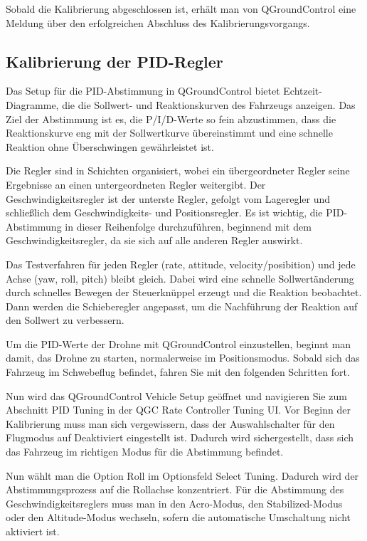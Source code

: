 Sobald die Kalibrierung abgeschlossen ist, erhält man von QGroundControl eine Meldung über den erfolgreichen Abschluss des Kalibrierungsvorgangs.

\subsection{Kalibrierung der PID-Regler}
Das Setup für die PID-Abstimmung in QGroundControl bietet Echtzeit-Diagramme, die die Sollwert- und Reaktionskurven des Fahrzeugs anzeigen. Das Ziel der Abstimmung ist es, die P/I/D-Werte so fein abzustimmen, dass die Reaktionskurve eng mit der Sollwertkurve übereinstimmt und eine schnelle Reaktion ohne Überschwingen gewährleistet ist.

Die Regler sind in Schichten organisiert, wobei ein übergeordneter Regler seine Ergebnisse an einen untergeordneten Regler weitergibt. Der Geschwindigkeitsregler ist der unterste Regler, gefolgt vom Lageregler und schließlich dem Geschwindigkeits- und Positionsregler. Es ist wichtig, die PID-Abstimmung in dieser Reihenfolge durchzuführen, beginnend mit dem Geschwindigkeitsregler, da sie sich auf alle anderen Regler auswirkt.

Das Testverfahren für jeden Regler (rate, attitude, velocity/posibition) und jede Achse (yaw, roll, pitch) bleibt gleich. Dabei wird eine schnelle Sollwertänderung durch schnelles Bewegen der Steuerknüppel erzeugt und die Reaktion beobachtet. Dann werden die Schieberegler angepasst, um die Nachführung der Reaktion auf den Sollwert zu verbessern.

Um die PID-Werte der Drohne mit QGroundControl einzustellen, beginnt man damit, das Drohne zu starten, normalerweise im Positionsmodus. Sobald sich das Fahrzeug im Schwebeflug befindet, fahren Sie mit den folgenden Schritten fort.

Nun wird  das QGroundControl Vehicle Setup geöffnet und navigieren Sie zum Abschnitt PID Tuning in der QGC Rate Controller Tuning UI. Vor Beginn der Kalibrierung muss man sich vergewissern, dass der Auswahlschalter für den Flugmodus auf Deaktiviert eingestellt ist. Dadurch wird sichergestellt, dass sich das Fahrzeug im richtigen Modus für die Abstimmung befindet.

Nun wählt man die Option Roll im Optionsfeld Select Tuning. Dadurch wird der Abstimmungsprozess auf die Rollachse konzentriert.
Für die Abstimmung des Geschwindigkeitsreglers muss man in den Acro-Modus, den Stabilized-Modus oder den Altitude-Modus wechseln, sofern die automatische Umschaltung nicht aktiviert ist.

